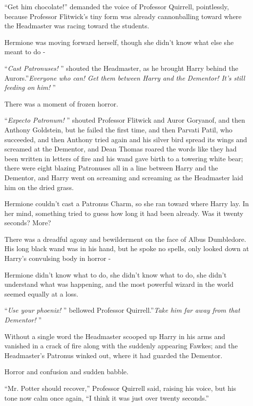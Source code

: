 ``Get him chocolate!'' demanded the voice of Professor Quirrell,
pointlessly, because Professor Flitwick's tiny form was already
cannonballing toward where the Headmaster was racing toward the
students.

Hermione was moving forward herself, though she didn't know what else
she meant to do -

``\emph{Cast Patronuses!} '' shouted the Headmaster, as he brought Harry
behind the Aurors.''\emph{Everyone who can! Get them between Harry and
the Dementor! It's still feeding on him!} ''

There was a moment of frozen horror.

``\emph{Expecto Patronum!} '' shouted Professor Flitwick and Auror
Goryanof, and then Anthony Goldstein, but he failed the first time, and
then Parvati Patil, who succeeded, and then Anthony tried again and his
silver bird spread its wings and screamed at the Dementor, and Dean
Thomas roared the words like they had been written in letters of fire
and his wand gave birth to a towering white bear; there were eight
blazing Patronuses all in a line between Harry and the Dementor, and
Harry went on screaming and screaming as the Headmaster laid him on the
dried grass.

Hermione couldn't cast a Patronus Charm, so she ran toward where Harry
lay. In her mind, something tried to guess how long it had been already.
Was it twenty seconds? More?

There was a dreadful agony and bewilderment on the face of Albus
Dumbledore. His long black wand was in his hand, but he spoke no spells,
only looked down at Harry's convulsing body in horror -

Hermione didn't know what to do, she didn't know what to do, she didn't
understand what was happening, and the most powerful wizard in the world
seemed equally at a loss.

``\emph{Use your phoenix!} '' bellowed Professor Quirrell.''\emph{Take him
far away from that Dementor!} ''

Without a single word the Headmaster scooped up Harry in his arms and
vanished in a crack of fire along with the suddenly appearing Fawkes;
and the Headmaster's Patronus winked out, where it had guarded the
Dementor.

Horror and confusion and sudden babble.

``Mr. Potter should recover,'' Professor Quirrell said, raising his
voice, but his tone now calm once again, ``I think it was just over
twenty seconds.''

